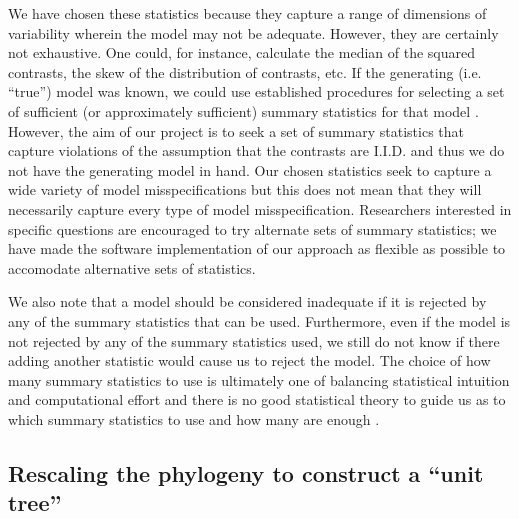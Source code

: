 \documentclass[a4paper,12pt]{article}
\begin{document}
We have chosen these statistics because they capture a range of dimensions of variability wherein the model may not be adequate. However, they are certainly not exhaustive. One could, for instance, calculate the median of the squared contrasts, the skew of the distribution of contrasts, etc. If the generating (i.e. ``true'') model was known, we could use established procedures for selecting a set of sufficient (or approximately sufficient) summary statistics for that model \citep[e.g.][]{MajoramJoyce}. However, the aim of our project is to seek a set of summary statistics that capture violations of the assumption that the contrasts are I.I.D. and thus we do not have the generating model in hand. Our chosen statistics seek to capture a wide variety of model misspecifications but this does not mean that they will necessarily capture every type of model misspecification. Researchers interested in specific questions are encouraged to try alternate sets of summary statistics; we have made the software implementation of our approach as flexible as possible to accomodate alternative sets of statistics.

We also note that a model should be considered inadequate if it is rejected by any of the summary statistics that can be used. Furthermore, even if the model is not rejected by any of the summary statistics used, we still do not know if there adding another statistic would cause us to reject the model. The choice of how many summary statistics to use is ultimately one of balancing statistical intuition and computational effort and there is no good statistical theory to guide us as to which summary statistics to use and how many are enough \citep{Gelmanbook}.

\subsection*{Rescaling the phylogeny to construct a ``unit tree''}
\end{document}
